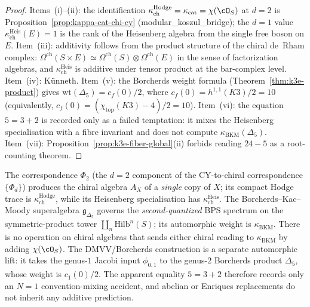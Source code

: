 \begin{proof}
Items~(i)--(ii): the identification \(\kappa_{\mathrm{ch}}^{\mathrm{Hodge}}=\kappa_{\mathrm{cat}}=\chi(\cO_S)\) at \(d=2\) is Proposition~\ref{prop:kappa-cat-chi-cy} (modular\_koszul\_bridge); the \(d=1\) value \(\kappa_{\mathrm{ch}}^{\mathrm{Heis}}(E)=1\) is the rank of the Heisenberg algebra from the single free boson on \(E\). Item~(iii): additivity follows from the product structure of the chiral de~Rham complex: \(\Omega^{\mathrm{ch}}(S\times E)\simeq\Omega^{\mathrm{ch}}(S)\otimes\Omega^{\mathrm{ch}}(E)\) in the sense of factorization algebras, and \(\kappa_{\mathrm{ch}}^{\mathrm{Heis}}\) is additive under tensor product at the bar-complex level. Item~(iv): K\"unneth. Item~(v): the Borcherds weight formula (Theorem~\ref{thm:k3e-product}) gives \(\mathrm{wt}(\Delta_5)=c_f(0)/2\), where \(c_f(0)=h^{1,1}(K3)/2=10\) (equivalently, \(c_f(0)=(\chi_{\mathrm{top}}(K3)-4)/2=10\)). Item~(vi): the equation \(5=3+2\) is recorded only as a failed temptation: it mixes the Heisenberg specialisation with a fibre invariant and does not compute \(\kappa_{\mathrm{BKM}}(\Delta_5)\). Item~(vii): Proposition~\ref{prop:k3e-fiber-global}(ii) forbids reading \(24-5\) as a root-counting theorem.
\end{proof}

\begin{remark}
\label{rem:kappa-ch-vs-kappa-bkm-mechanism}
The correspondence \(\Phi_2\) (the \(d=2\) component of the CY-to-chiral correspondence \(\{\Phi_d\}\)) produces the chiral algebra \(A_X\) of a \emph{single} copy of \(X\); its compact Hodge trace is \(\kappa_{\mathrm{ch}}^{\mathrm{Hodge}}\), while its Heisenberg specialisation has \(\kappa_{\mathrm{ch}}^{\mathrm{Heis}}\). The Borcherds--Kac--Moody superalgebra \(\mathfrak{g}_{\Delta_5}\) governs the \emph{second-quantized} BPS spectrum on the symmetric-product tower \(\coprod_n \mathrm{Hilb}^n(S)\); its automorphic weight is \(\kappa_{\mathrm{BKM}}\). There is no operation on chiral algebras that sends either chiral reading to \(\kappa_{\mathrm{BKM}}\) by adding \(\chi(\cO_S)\). The DMVV/Borcherds construction is a separate automorphic lift: it takes the genus-\(1\) Jacobi input \(\phi_{0,1}\) to the genus-\(2\) Borcherds product \(\Delta_5\), whose weight is \(c_1(0)/2\). The apparent equality \(5=3+2\) therefore records only an \(N=1\) convention-mixing accident, and abelian or Enriques replacements do not inherit any additive prediction.
\end{remark}

